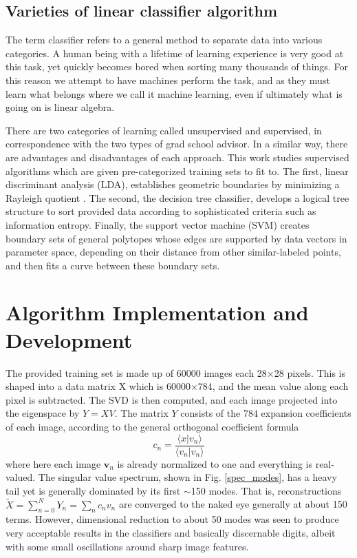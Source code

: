 \documentclass{article}
\begin{document}
\subsection{Varieties of linear classifier algorithm}\label{class_sec}
The term classifier refers to a general method to separate data into various categories. A human being with a lifetime of learning experience is very good at this task, yet quickly becomes bored when sorting many thousands of things. For this reason we attempt to have machines perform the task, and as they must learn what belongs where we call it machine learning, even if ultimately what is going on is linear algebra.

There are two categories of learning called unsupervised and supervised, in correspondence with the two types of grad school advisor. In a similar way, there are advantages and disadvantages of each approach. This work studies supervised algorithms which are given pre-categorized training sets to fit to. The first, linear discriminant analysis (LDA), establishes geometric boundaries by minimizing a Rayleigh quotient \cite{kutz}. The second, the decision tree classifier, develops a logical tree structure to sort provided data according to sophisticated criteria such as information entropy. Finally, the support vector machine (SVM) creates boundary sets of general polytopes whose edges are supported by data vectors in parameter space, depending on their distance from other similar-labeled points, and then fits a curve between these boundary sets.

\section{Algorithm Implementation and Development}\label{section}
The provided training set is made up of 60000 images each 28$\times$28 pixels. This is shaped into a data matrix X which is 60000$\times$784, and the mean value along each pixel is subtracted. The SVD is then computed, and each image projected into the eigenspace by $Y = XV$. The matrix $Y$ consists of the $784$ expansion coefficients of each image, according to the general orthogonal coefficient
formula
\begin{equation}
  c_n = \frac{\langle x | v_n\rangle}{\langle v_n| v_n\rangle}
\end{equation}
where here each image $\bm{v}_n$ is already normalized to one and everything is real-valued. The singular value spectrum, shown in Fig. \ref{spec_modes}, has a heavy tail yet is generally dominated by its first $\sim$150 modes. That is, reconstructions $\widetilde{X} = \sum_{n=0}^NY_n = \sum_nc_nv_n$ are converged to the naked eye generally at about 150 terms. However, dimensional reduction to about 50 modes was seen to produce very acceptable results in the classifiers and basically discernable digits, albeit with some small oscillations around sharp image features.
\end{document}
